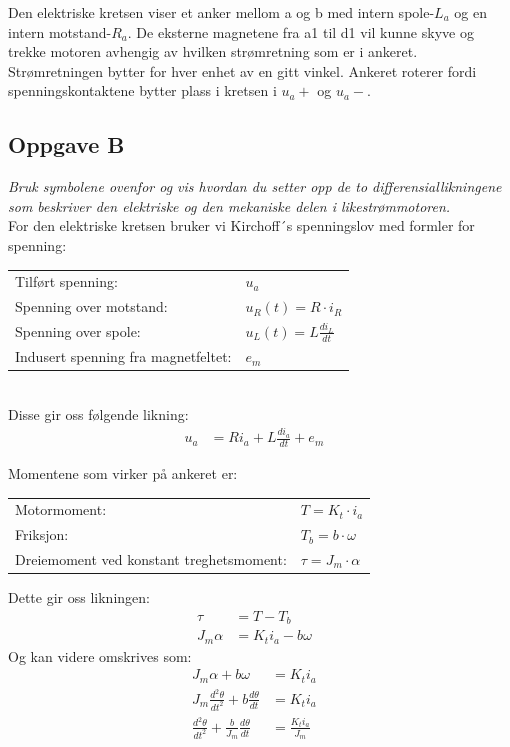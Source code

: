 Den elektriske kretsen viser et anker mellom a og b med intern spole-$L_a$ og en intern motstand-$R_a$.
De eksterne magnetene fra a1 til d1 vil kunne skyve og trekke motoren avhengig av hvilken strømretning som er i ankeret. Strømretningen bytter for hver enhet av en gitt vinkel. Ankeret roterer fordi spenningskontaktene bytter plass i kretsen i $u_a+$ og $u_a-$.


\subsection{Oppgave B}

\emph{Bruk symbolene ovenfor og vis hvordan du setter opp de to differensiallikningene som
	beskriver den elektriske og den mekaniske delen i likestrømmotoren.}\\

For den elektriske kretsen bruker vi Kirchoff´s spenningslov med formler for spenning:\\
\begin{tabular}{ll}
	Tilført spenning:                   & $u_a$                       \\
	Spenning over motstand:             & $u_R(t) = R\cdot i_R$       \\
	Spenning over spole:                & $u_L(t) = L\frac{di_L}{dt}$ \\
	Indusert spenning fra magnetfeltet: & $e_m$                       
\end{tabular}\\

Disse gir oss følgende likning: 
\begin{align}
	u_a & = Ri_a + L\frac{di_a}{dt} + e_m &   
	\label{eqn:ode_elec}
\end{align}

Momentene som virker på ankeret er:

\begin{tabular}{ll}
	Motormoment:                             & $T = K_t\cdot i_a$       \\
	Friksjon:                                & $T_b = b\cdot \omega$    \\
	Dreiemoment ved konstant treghetsmoment: & $\tau = J_m\cdot \alpha$ 
\end{tabular}

Dette gir oss likningen:
\begin{align*}
	\tau & = T - T_b &   \\
	J_m\alpha &=  K_ti_a - b\omega
\end{align*}
Og kan videre omskrives som:
\begin{align}
	J_m\alpha + b\omega & = K_ti_a\nonumber &   \\
	J_m\frac{d^2\theta}{dt^2} + b\frac{d\theta}{dt} &= K_ti_a\nonumber\\
	\frac{d^2\theta}{dt^2} + \frac{b}{J_m}\frac{d\theta}{dt} &= \frac{K_ti_a}{J_m}
	\label{eqn:ode_mech}
\end{align}\\


